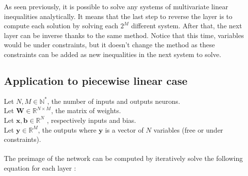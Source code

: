 \documentclass{article}
\begin{document}
As seen previously, it is possible to solve any systems of multivariate linear inequalities analytically.
It means that the last step to reverse the layer is to compute each solution by solving each $2^{M}$ different system. 
After that, the next layer can be inverse thanks to the same method. Notice that this time, variables would be under constraints, 
but it doesn't change the method as these constraints can be added as new inequalities in the next system to solve.


\subsection{Application to piecewise linear case}
Let $ N,M \in \mathbb{N^{*}}$, the number of inputs and outputs neurons.\\
Let $\textbf{W}\in \mathbb{R}^{N \times M}$, the matrix of weights.\\
Let $\textbf{x},\textbf{b} \in \mathbb{R}^{N}$ , respectively inputs and bias.\\
Let $\textbf{y} \in \mathbb{R}^{M}$, the outputs where $\textbf{y}$ is a vector of $N$ variables (free or under constraints).\\\\
The preimage of the network can be computed by iteratively solve the following equation for each layer :
\end{document}
